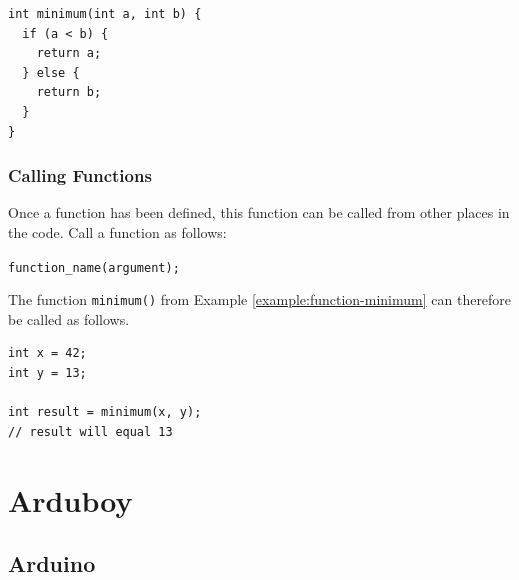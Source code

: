 \documentclass[11pt,fleqn]{book} %
\begin{document}
\begin{example}
	\label{example:function-minimum}
	\phantom{ }
	\begin{verbatim}
int minimum(int a, int b) {
  if (a < b) {
    return a;
  } else {
    return b;
  }
}
	\end{verbatim}
\end{example}

\section{Calling Functions}
Once a function has been defined, this function can be called from other places in the code. Call a function as follows:

\begin{center}
	\texttt{function\_name(argument);}
\end{center}
\noindent
The function \texttt{minimum()} from Example \ref{example:function-minimum} can therefore be called as follows.

\begin{example}
	\phantom{ }
	\begin{verbatim}
int x = 42;
int y = 13;

int result = minimum(x, y);
// result will equal 13
	\end{verbatim}
\end{example}


\part{Arduboy}

\chapter{Arduino}
\end{document}

